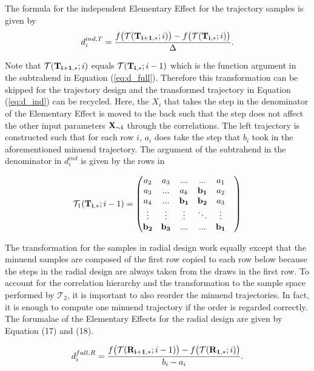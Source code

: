 \documentclass[a4paper,12pt]{article}
\begin{document}
\noindent
The formula for the independent Elementary Effect for the trajectory samples is given by
\begin{align} \label{eq:d_ind}
d_i^{ind, T} = \frac{f\big(\mathcal{T}(\bold{T_{i+1,*}}; i)\big) - f\big(\mathcal{T}(\bold{T_{i,*}}; i)\big)}{\Delta}.
\end{align}

\noindent
Note that $\mathcal{T}(\bold{T_{i+1,*}}; i)$ equals $\mathcal{T}(\bold{T_{i,*}}; i-1)$ which is the function argument in the subtrahend in Equation (\ref{eq:d_full}). Therefore this transformation can be skipped for the trajectory design and the transformed trajectory in Equation (\ref{eq:d_ind}) can be recycled. Here, the $X_i$ that takes the step in the denominator of the Elementary Effect is moved to the back such that the step does not affect the other input parameters $\bold{X_{\sim i}}$ through the correlations. The left trajectory is constructed such that for each row $i$, $a_i$ does take the step that $b_i$ took in the aforementioned minuend trajectory. The argument of the subtrahend in the denominator in $d_i^{ind}$ is given by the rows in

\begin{align}
\mathcal{T}_1(\bold{T_{i,*}}; i-1)=
\begin{pmatrix}
a_2 & a_3 & ... & ... &  a_1 \\
a_3 & ... & a_k &  \bold{b_1} & a_2 \\
a_4 & ... & \bold{b_1} &  \bold{b_2} & a_3 & \\
\vdots & \vdots & \vdots & 	\ddots &  \vdots\\
\bold{b_2} & \bold{b_{3}} & ... & ... &  \bold{b_{1}}
\end{pmatrix}
\end{align}

\noindent
The transformation for the samples in radial design work equally except that the minuend samples are composed of the first row copied to each row below because the steps in the radial design are always taken from the draws in the first row. To account for the correlation hierarchy and the transformation to the sample space performed by $\mathcal{T}_2$, it is important to also reorder the minuend trajectories. In fact, it is enough to compute one minuend trajectory if the order is regarded correctly. The forumalae of the Elementary Effects for the radial design are given by Equation (17) and (18).

\begin{align}
d_i^{full, R} = \frac{f\big(\mathcal{T}(\bold{R_{i+1,*}}; i-1)\big) - f\big(\mathcal{T}(\bold{R_{1,*}}; i)\big)}{b_i - a_i}.
\end{align}
\end{document}
